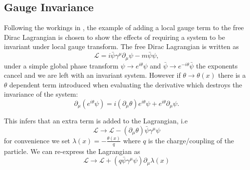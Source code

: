 \subsection{Gauge Invariance} %
\label{sub:gauge_invariance}
Following the workings in \cite{griffiths}, the example of adding a local gauge 
term to the free Dirac Lagrangian is chosen to show the effects of requiring a 
system to be invariant under local gauge transform. The free Dirac Lagrangian 
is written as
\begin{equation}
  \mathcal{L} = i\bar{\psi}\gamma^{\mu}\partial_{\mu}\psi - m\bar{\psi}\psi,
  \label{eq:freeDiracL}
\end{equation}
under a simple global phase transform $\psi\rightarrow e^{i\theta}\psi$ and 
$\bar{\psi}\rightarrow e^{-i\theta}\bar{\psi}$ the exponents cancel and we are 
left with an invariant system. However if $\theta\rightarrow\theta (x)$ there 
is a $\theta$ dependent  term introduced when evaluating the derivative which 
destroys the invariance of the system:
\begin{equation}
  \partial_{\mu}\left(e^{i\theta}\psi\right) = i\left(\partial_{\mu}\theta\right)e^{i\theta}\psi + e^{i\theta}\partial_{\mu}\psi.
\end{equation} 

This infers that an extra term is added to the Lagrangian, i.e
\begin{equation}
  \mathcal{L}\rightarrow\mathcal{L}-\left(\partial_{\mu}\theta\right)\bar{\psi}\gamma^{\mu}\psi
\end{equation}
for convenience we set $\lambda(x) = -\frac{\theta(x)}{q}$ where $q$ is the 
charge/coupling of the particle. We can re-express the Lagrangian as
\begin{equation}  \mathcal{L} \rightarrow \mathcal{L} + \left( q\bar{\psi}\gamma^{\mu} \psi \right) \partial_{\mu} \lambda(x)
  \label{eq:diracLplusLambda}
\end{equation}


